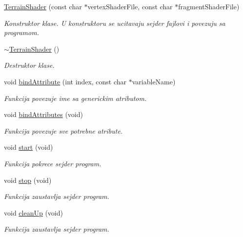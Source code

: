 \begin{DoxyCompactItemize}
\item 
\hyperlink{classshader_1_1TerrainShader_a8d6dee90d8aabf83f0a5576c65d2e6e1}{Terrain\+Shader} (const char $\ast$vertex\+Shader\+File, const char $\ast$fragment\+Shader\+File)
\begin{DoxyCompactList}\small\item\em Konstruktor klase. U konstruktoru se ucitavaju sejder fajlovi i povezuju sa programom. \end{DoxyCompactList}\item 
\hyperlink{classshader_1_1TerrainShader_afc13c4f8a4b8b6f737c9729d47c62550}{$\sim$\+Terrain\+Shader} ()
\begin{DoxyCompactList}\small\item\em Destruktor klase. \end{DoxyCompactList}\item 
void \hyperlink{classshader_1_1TerrainShader_ae414b98f36de2a58d9c7f18ae6b9880a}{bind\+Attribute} (int index, const char $\ast$variable\+Name)
\begin{DoxyCompactList}\small\item\em Funkcija povezuje ime sa generickim atributom. \end{DoxyCompactList}\item 
void \hyperlink{classshader_1_1TerrainShader_afca63864591afe38d57ff8ae39aa8911}{bind\+Attributes} (void)
\begin{DoxyCompactList}\small\item\em Funkcija povezuje sve potrebne atribute. \end{DoxyCompactList}\item 
void \hyperlink{classshader_1_1TerrainShader_a1a198e23fea4d47a75bf7c1c90216d18}{start} (void)
\begin{DoxyCompactList}\small\item\em Funkcija pokrece sejder program. \end{DoxyCompactList}\item 
void \hyperlink{classshader_1_1TerrainShader_acee0c1d3730febbd229b5eee94696829}{stop} (void)
\begin{DoxyCompactList}\small\item\em Funkcija zaustavlja sejder program. \end{DoxyCompactList}\item 
void \hyperlink{classshader_1_1TerrainShader_a98782288fa07057e24ab2a88e0020e03}{clean\+Up} (void)
\begin{DoxyCompactList}\small\item\em Funkcija zaustavlja sejder program. \end{DoxyCompactList}\item 

\end{DoxyCompactItemize}
